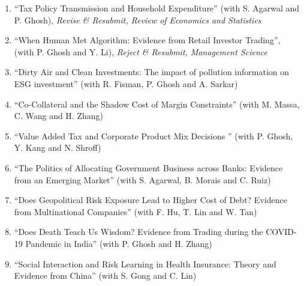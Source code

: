 \documentclass[margin,line]{res}
\begin{document}
\begin{resume}
\begin{enumerate}
\item 	``Tax Policy Transmission and Household Expenditure'' (with S. Agarwal and P. Ghosh),	\textit{Revise \& Resubmit, Review of Economics and Statistics} %
\vspace*{0.2cm}
\item 	``When Human Met Algorithm: Evidence from Retail Investor Trading'', (with P.  Ghosh and Y. Li), \textit{Reject \& Resubmit, Management Science}	%
\vspace*{0.2cm} 
\item %
``Dirty Air and Clean Investments: The impact of pollution information on ESG investment'' (with R. Fisman, P. Ghosh and A. Sarkar)
\vspace*{0.2cm}
\item ``Co-Collateral and the Shadow Cost of Margin Constraints'' (with M. Massa, C. Wang and H. Zhang)
\vspace*{0.2cm}
\item %
``Value Added Tax and Corporate Product Mix Decisions '' (with P. Ghosh, Y. Kang and N. Shroff)
\vspace*{0.2cm}
\item %
``The Politics of Allocating Government Business across Banks:
Evidence from an Emerging Market'' (with S. Agarwal, B. Morais and C. Ruiz)
\vspace*{0.2cm}
\item %
``Does Geopolitical Risk Exposure Lead to Higher Cost of Debt? Evidence from Multinational Companies'' (with F. Hu, T. Lin and W. Tan)
\vspace*{0.2cm}
\vspace*{0.2cm}
\item ``Does Death Teach Us Wisdom? Evidence from Trading during the COVID-19 Pandemic in India'' (with P. Ghosh and H. Zhang)
\vspace*{0.2cm}

\item %
``Social Interaction and Risk Learning in Health Insurance: Theory and Evidence from China'' (with S. Gong and C. Lin)
\vspace*{0.2cm}


\end{enumerate}
\end{resume}
\end{document}
